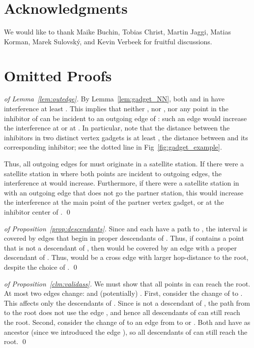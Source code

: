 \documentclass[envcountsect,envcountsame,runningheads,a4paper]{llncs}
\begin{document}
\section*{Acknowledgments}
We would like to thank Maike Buchin, Tobias Christ, Martin Jaggi, Matias Korman, Marek Sulovsk\'y,
and Kevin Verbeek for fruitful discussions.




\newpage
\appendix
\section{Omitted Proofs}\label{sec:omitted}

\begin{proof}[of Lemma~\ref{lem:outedge}]
By Lemma~\ref{lem:gadget_NN}, both
 and  in  have interference
at least .
This implies that neither , nor , nor
any point in the inhibitor of  can be
incident to an outgoing edge of :
such an edge would increase the interference at
 or at .
In particular, note that the
distance between the inhibitors in
two distinct vertex gadgets is at least
,
the distance between 
and its corresponding inhibitor; see the
dotted line in Fig~\ref{fig:gadget_example}.

Thus, all outgoing edges for  must originate in
a satellite station.
If there were a satellite station in  where
both points are incident to outgoing edges,
the interference at  would increase.
Furthermore, if there were a satellite station in  with
an outgoing edge that does not go the partner station,
this would increase the interference at the main point
of the partner vertex gadget, or at the inhibitor center  of .
\qed{}
\end{proof}

\begin{proof}[of Proposition~\ref{prop:descendants}]
Since  and  each have a
path to , the  interval  is
covered by edges that begin in proper descendants of .
Thus, if  contains a point  that is not a descendant
of , then  would be covered by an edge  with
 a proper descendant of .
Thus,  would be a cross edge with larger hop-distance to the
root, despite the choice of .
\qed{}
\end{proof}


\begin{proof}[of Proposition~\ref{clm:validass}]
We must show that all points in  can reach the root.
At most two edges change:  and (potentially)
.
First, consider the change of  to .
This affects only the descendants of .
Since  is not a descendant of ,
the path from  to the root does not use the edge , and hence
all descendants of  can still reach the root.
Second, consider the change of  to an edge from  to
 or . Both  and  have  as ancestor (since we
introduced the edge ), so all descendants of 
can still reach the root.
\qed{}
\end{proof}
\end{document}
